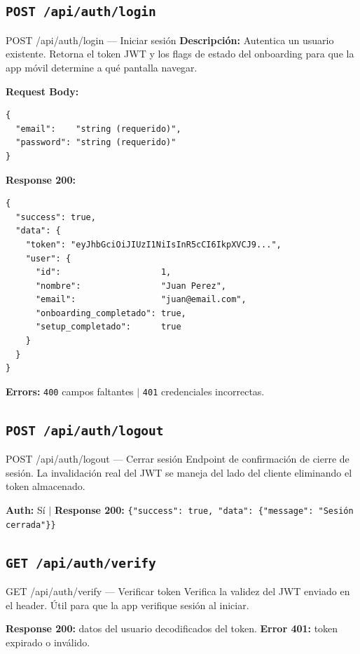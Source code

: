 \subsection{\texttt{POST /api/auth/login}}

\begin{epbox}{POST /api/auth/login --- Iniciar sesión}
\textbf{Descripción:} Autentica un usuario existente. Retorna el token JWT y los flags de estado del onboarding para que la app móvil determine a qué pantalla navegar.

\textbf{Request Body:}
\begin{lstlisting}[style=json]
{
  "email":    "string (requerido)",
  "password": "string (requerido)"
}
\end{lstlisting}

\textbf{Response 200:}
\begin{lstlisting}[style=json]
{
  "success": true,
  "data": {
    "token": "eyJhbGciOiJIUzI1NiIsInR5cCI6IkpXVCJ9...",
    "user": {
      "id":                    1,
      "nombre":                "Juan Perez",
      "email":                 "juan@email.com",
      "onboarding_completado": true,
      "setup_completado":      true
    }
  }
}
\end{lstlisting}

\textbf{Errors:} \texttt{400} campos faltantes $|$ \texttt{401} credenciales incorrectas.
\end{epbox}

\subsection{\texttt{POST /api/auth/logout}}

\begin{epbox}{POST /api/auth/logout --- Cerrar sesión}
Endpoint de confirmación de cierre de sesión. La invalidación real del JWT se maneja del lado del cliente eliminando el token almacenado.

\textbf{Auth:} Sí $|$ \textbf{Response 200:} \texttt{\{"success": true, "data": \{"message": "Sesión cerrada"\}\}}
\end{epbox}

\subsection{\texttt{GET /api/auth/verify}}

\begin{epbox}{GET /api/auth/verify --- Verificar token}
Verifica la validez del JWT enviado en el header. Útil para que la app verifique sesión al iniciar.

\textbf{Response 200:} datos del usuario decodificados del token.
\textbf{Error 401:} token expirado o inválido.
\end{epbox}

